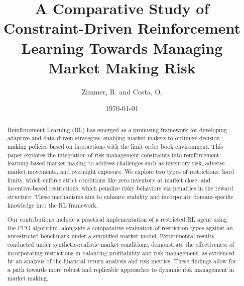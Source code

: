 \title{A Comparative Study of Constraint-Driven Reinforcement Learning Towards Managing Market Making Risk}
\author{Zimmer, R. and Costa, O.}
\date{\today}

\maketitle

\begin{abstract}
    Reinforcement Learning (RL) has emerged as a promising framework for developing adaptive and data-driven strategies,
    enabling market makers to optimize decision-making policies based on interactions with the limit order book environment.
    This paper explores the integration of risk management constraints into reinforcement learning-based market making to address challenges
    such as inventory risk, adverse market movements, and overnight exposure.
    We explore two types of restrictions: hard limits, which enforce strict conditions like zero inventory at market close,
    and incentive-based restrictions, which penalize risky behaviors via penalties in the reward structure.
    These mechanisms aim to enhance stability and incorporate domain-specific knowledge into the RL framework.

    Our contributions include a practical implementation of a restricted RL agent using the PPO algorithm,
    alongside a comparative evaluation of restriction types against an unrestricted benchmark under a simplified market model.
    Experimental results, conducted under synthetic-realistic market conditions,
    demonstrate the effectiveness of incorporating restrictions in balancing profitability and risk management,
    as evidenced by an analysis of the financial return analysis and risk metrics.
    These findings allow for a path towards more robust and replicable approaches to dynamic risk management in market making.
\end{abstract}